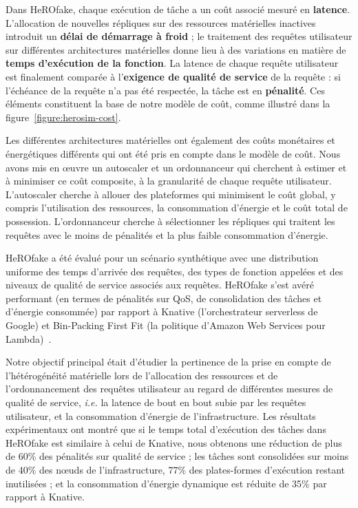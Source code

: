 Dans HeROfake, chaque exécution de tâche a un coût associé mesuré en \textbf{latence}. L'allocation de nouvelles répliques sur des ressources matérielles inactives introduit un \textbf{délai de démarrage à froid} ; le traitement des requêtes utilisateur sur différentes architectures matérielles donne lieu à des variations en matière de \textbf{temps d'exécution de la fonction}. La latence de chaque requête utilisateur est finalement comparée à l'\textbf{exigence de qualité de service} de la requête : si l'échéance de la requête n'a pas été respectée, la tâche est en \textbf{pénalité}. Ces éléments constituent la base de notre modèle de coût, comme illustré dans la figure~\ref{figure:herosim-cost}.

Les différentes architectures matérielles ont également des coûts monétaires et énergétiques différents qui ont été pris en compte dans le modèle de coût. Nous avons mis en œuvre un autoscaler et un ordonnanceur qui cherchent à estimer et à minimiser ce coût composite, à la granularité de chaque requête utilisateur. L'autoscaler cherche à allouer des plateformes qui minimisent le coût global, y compris l'utilisation des ressources, la consommation d'énergie et le coût total de possession. L'ordonnanceur cherche à sélectionner les répliques qui traitent les requêtes avec le moins de pénalités et la plus faible consommation d'énergie.

HeROfake a été évalué pour un scénario synthétique avec une distribution uniforme des temps d'arrivée des requêtes, des types de fonction appelées et des niveaux de qualité de service associés aux requêtes. HeROfake s'est avéré performant (en termes de pénalités sur QoS, de consolidation des tâches et d'énergie consommée) par rapport à Knative (l'orchestrateur serverless de Google) et Bin-Packing First Fit (la politique d'Amazon Web Services pour Lambda)~\cite{aws-lambda, herofake}.

Notre objectif principal était d'étudier la pertinence de la prise en compte de l'hétérogénéité matérielle lors de l'allocation des ressources et de l'ordonnancement des requêtes utilisateur au regard de différentes mesures de qualité de service, \textit{i.e.} la latence de bout en bout subie par les requêtes utilisateur, et la consommation d'énergie de l'infrastructure. Les résultats expérimentaux ont montré que si le temps total d'exécution des tâches dans HeROfake est similaire à celui de Knative, nous obtenons une réduction de plus de 60\% des pénalités sur qualité de service ; les tâches sont consolidées sur moins de 40\% des nœuds de l'infrastructure, 77\% des plates-formes d'exécution restant inutilisées ; et la consommation d'énergie dynamique est réduite de 35\% par rapport à Knative.

